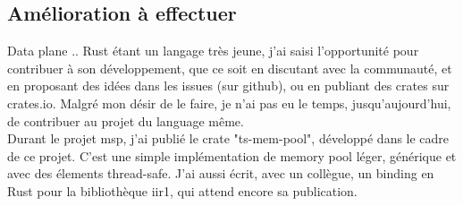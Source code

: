     \subsection{Amélioration à effectuer}
        Data plane .. 
        Rust étant un langage très jeune, j'ai saisi l'opportunité pour contribuer
        à son développement, que ce soit en discutant avec la communauté, et en
        proposant des idées dans les issues (sur github), ou en publiant des crates sur
        crates.io\cite{crates_io}. Malgré mon désir de le faire, je n'ai pas eu
        le temps, jusqu'aujourd'hui, de contribuer au projet du language même.\\[0.3cm]
        Durant le projet \gls{msp}, j'ai publié le crate
        "ts-mem-pool"\cite{mem_pool}, développé dans le cadre de ce projet.
        C'est une simple implémentation de memory pool léger, générique et avec
        des élements thread-safe. J'ai aussi écrit, avec un collègue, un binding
        en Rust pour la bibliothèque iir1\cite{iir1}, qui attend encore sa publication.
